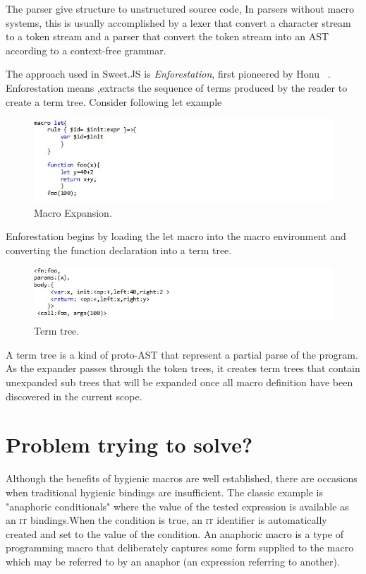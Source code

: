 The parser give structure to unstructured source code, In parsers without macro systems, this is usually accomplished by a lexer that convert a character stream to a token stream and a parser that convert the token stream into an AST according to a context-free grammar.

The approach used in Sweet.JS is \textit{Enforestation}, first pioneered by Honu ~\cite{bib4}. Enforestation means ,extracts the sequence of terms produced by the reader to create a term tree. Consider following let example 

\begin{figure}[htb]
\centering
\includegraphics[width=1.0\textwidth]{images/enforest.jpg}
\caption{Macro Expansion.} 
\label{fig:AST}

\end{figure}
Enforestation begins by loading the let macro into the macro environment and converting the function declaration into a term tree.

\begin{figure}[htb]
\centering
\includegraphics[width=1.0\textwidth]{images/enforest1.jpg}
\caption{Term tree.} 
\label{fig:AST}

\end{figure}

A term tree is a kind of proto-AST that represent a partial parse of the program. As the expander passes through the token trees, it creates term trees that contain unexpanded sub trees that will be expanded once all macro definition have been discovered in the current scope.

\section{Problem trying to solve?}

Although the benefits of hygienic macros are well established, there are occasions when traditional hygienic bindings are insufficient. The classic example is "anaphoric conditionals" where the value of the tested expression is available as an \textsc{it} bindings.When the condition is true, an \textsc{it} identifier is automatically created and set to the value of the condition. An anaphoric macro is a type of programming macro that deliberately captures some form supplied to the macro which may be referred to by an anaphor (an expression referring to another).

